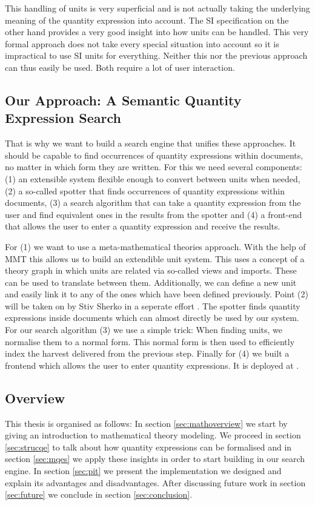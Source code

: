 This handling of units is very superficial and is not actually taking the underlying meaning of the quantity expression into account. The SI specification \cite{sispec} on the other hand provides a very good insight into how units can be handled. This very formal approach does not take every special situation into account so it is impractical to use SI units for everything. Neither this nor the previous approach can thus easily be used. Both require a lot of user interaction.

\subsection{Our Approach: A Semantic Quantity Expression Search}

That is why we want to build a search engine that unifies these approaches. It should be capable to find occurrences of quantity expressions within documents, no matter in which form they are written. For this we need several components: (1) an extensible system flexible enough to convert between units when needed, (2) a so-called spotter that finds occurrences of quantity expressions within documents, (3) a search algorithm that can take a quantity expression from the user and find equivalent ones in the results from the spotter and (4) a front-end that allows the user to enter a quantity expression and receive the results.

For (1) we want to use a meta-mathematical theories approach. With the help of MMT this allows us to build an extendible unit system. This uses a concept of a theory graph in which units are related via so-called views and imports. These can be used to translate between them. Additionally, we can define a new unit and easily link it to any of the ones which have been defined previously. Point (2) will be taken on by Stiv Sherko in a seperate effort \cite{proposal:sharko}. The spotter finds quantity expressions inside documents which can almost directly be used by our system. For our search algorithm (3) we use a simple trick: When finding units, we normalise them to a normal form. This normal form is then used to efficiently index the harvest delivered from the previous step. Finally for (4) we built a frontend which allows the user to enter quantity expressions. It is deployed at .


\subsection{Overview}

This thesis is organised as follows: In section \ref{sec:mathoverview} we start by giving an introduction to mathematical theory modeling. We proceed in section \ref{sec:strucqe} to talk about how quantity expressions can be formalised and in section \ref{sec:mqes} we apply these insights in order to start building in our search engine. In section \ref{sec:pit} we present the implementation we designed and explain its advantages and disadvantages. After discussing future work in section \ref{sec:future} we conclude in section \ref{sec:conclusion}.

